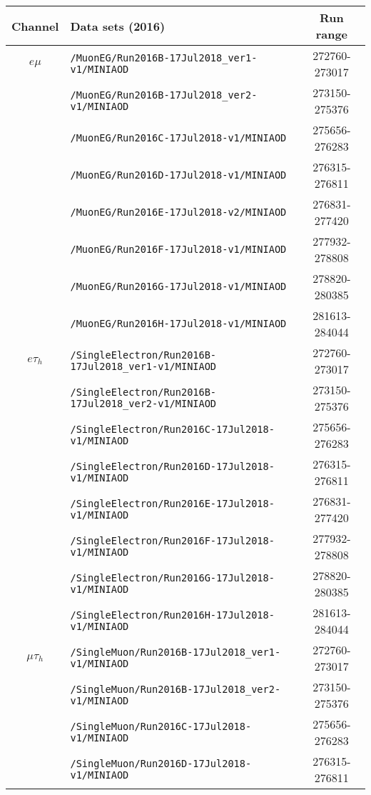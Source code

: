 \begin{table}[ht]
    \begin{center}
    {\scriptsize
    \begin{tabular}{|c|l|c|}
    \hline
    Channel & Data sets (2016) & Run range\\
    \hline
    $e\mu$ & \texttt{/MuonEG/Run2016B-17Jul2018\_ver1-v1/MINIAOD} & 272760-273017\\
    & \texttt{/MuonEG/Run2016B-17Jul2018\_ver2-v1/MINIAOD} & 273150-275376\\
    & \texttt{/MuonEG/Run2016C-17Jul2018-v1/MINIAOD} & 275656-276283\\
    & \texttt{/MuonEG/Run2016D-17Jul2018-v1/MINIAOD} & 276315-276811\\
    & \texttt{/MuonEG/Run2016E-17Jul2018-v2/MINIAOD} & 276831-277420\\
    & \texttt{/MuonEG/Run2016F-17Jul2018-v1/MINIAOD} & 277932-278808\\
    & \texttt{/MuonEG/Run2016G-17Jul2018-v1/MINIAOD} & 278820-280385\\
    & \texttt{/MuonEG/Run2016H-17Jul2018-v1/MINIAOD} & 281613-284044\\
    \hline
    $e\tau_{h}$ & \texttt{/SingleElectron/Run2016B-17Jul2018\_ver1-v1/MINIAOD} & 272760-273017\\
    & \texttt{/SingleElectron/Run2016B-17Jul2018\_ver2-v1/MINIAOD} & 273150-275376\\
    & \texttt{/SingleElectron/Run2016C-17Jul2018-v1/MINIAOD} & 275656-276283\\
    & \texttt{/SingleElectron/Run2016D-17Jul2018-v1/MINIAOD} & 276315-276811\\
    & \texttt{/SingleElectron/Run2016E-17Jul2018-v1/MINIAOD} & 276831-277420\\
    & \texttt{/SingleElectron/Run2016F-17Jul2018-v1/MINIAOD} & 277932-278808\\
    & \texttt{/SingleElectron/Run2016G-17Jul2018-v1/MINIAOD} & 278820-280385\\
    & \texttt{/SingleElectron/Run2016H-17Jul2018-v1/MINIAOD} & 281613-284044\\
    \hline
    $\mu\tau_{h}$ & \texttt{/SingleMuon/Run2016B-17Jul2018\_ver1-v1/MINIAOD} & 272760-273017\\
    & \texttt{/SingleMuon/Run2016B-17Jul2018\_ver2-v1/MINIAOD} & 273150-275376\\
    & \texttt{/SingleMuon/Run2016C-17Jul2018-v1/MINIAOD} & 275656-276283\\
    & \texttt{/SingleMuon/Run2016D-17Jul2018-v1/MINIAOD} & 276315-276811\\

\end{tabular}}
\end{center}
\end{table}
